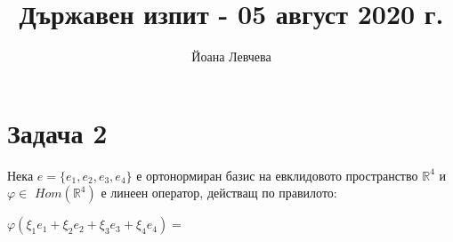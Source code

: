 \documentclass{article}
\title{Държавен изпит - 05 август 2020 г.}
\author{Йоана Левчева }
\begin{document}
\maketitle

\section*{Задача 2}

\justify

Нека $e = \{e_1, e_2, e_3, e_4\}$ е ортонормиран базис на евклидовото пространство $\mathbb{R}^4$ и $\varphi\in$ $Hom(\mathbb{R}^4)$ е линеен оператор, действащ по правилото:

\begin{center}
    $\varphi(\xi_1 e_1 + \xi_2 e_2 + \xi_3 e_3 + \xi_4 e_4) = $
\end{center}
\end{document}
